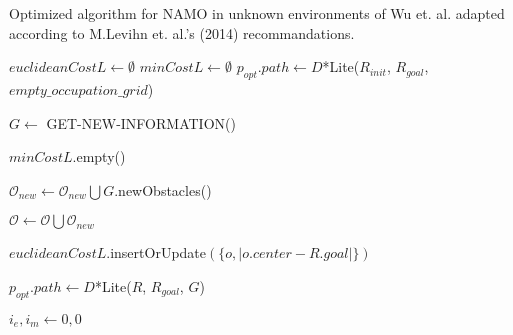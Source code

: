 \begin{algorithm}[H]

  \caption{Optimized algorithm for NAMO in unknown environments of Wu et. al. adapted according to M.Levihn et. al.'s (2014) recommandations. }

  \label{alg:namoue_augmented}

  \begin{algorithmic}[1]


        \State {}
        \State $euclideanCostL \gets \emptyset$ 
        \State $minCostL \gets \emptyset$ 
        \State $p_{opt}.path \gets D$*Lite($R_{init}$, $R_{goal}$, $empty\_occupation\_grid$) 

        \State {}


        \State $G \gets $ GET-NEW-INFORMATION()

         
          \State $minCostL$.empty() 
        \EndIf

        \State $\mathcal{O}_{new} \gets \mathcal{O}_{new} \bigcup G.$newObstacles()


            \State $\mathcal{O} \gets \mathcal{O} \bigcup \mathcal{O}_{new}$

              \State $euclideanCostL$.insertOrUpdate$(\{o, |o.center - R.goal|\})$
            \EndFor

            \State $p_{opt}.path \gets D$*Lite($R$, $R_{goal}$, $G$)
            \State {}

            \State $i_{e}, i_{m} \gets 0 , 0$ 


\end{algorithmic}
\end{algorithm}
